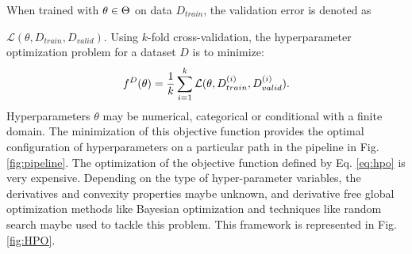 When trained with $\emph{$\theta$} \in \textbf{$\Theta$}$ on data $D_{train}$, the validation error is denoted as \par
\noindent $\mathcal{L}(\theta, D_{train}, D_{valid})$. Using $k$-fold cross-validation, the hyperparameter optimization problem for a dataset $D$ is to minimize:
\begin{equation}
f^D(\theta) = \frac{1}{k}\sum_{i=1}^{k} \mathcal{L}(\emph{$\theta$}, D_{train}^{(i)}, D_{valid}^{(i)}).
\label{eq:hpo}
\end{equation}
Hyperparameters $\theta$ may be numerical, categorical or conditional with a finite domain. The minimization of this objective function provides the optimal configuration of hyperparameters on a particular path in the pipeline in Fig. \ref{fig:pipeline}. The optimization of the objective function defined by Eq. \ref{eq:hpo} is very expensive. Depending on the type of hyper-parameter variables, the derivatives and convexity properties maybe unknown, and derivative free global optimization methods like Bayesian optimization and techniques like random search maybe used to tackle this problem. This framework is represented in Fig. \ref{fig:HPO}.



